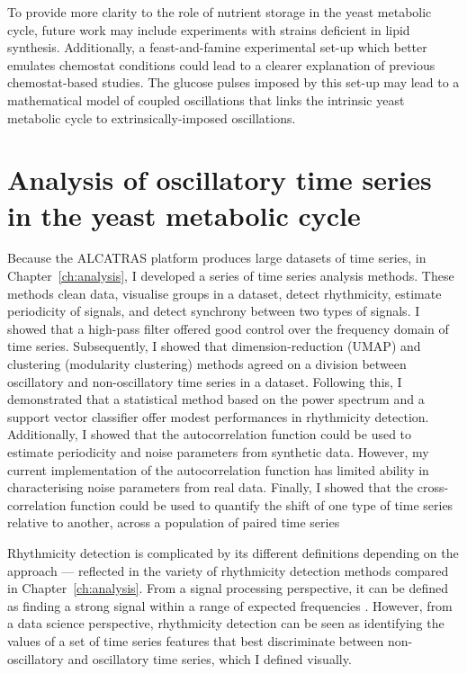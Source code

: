 To provide more clarity to the role of nutrient storage in the yeast metabolic cycle, future work may include experiments with strains deficient in lipid synthesis.
Additionally, a feast-and-famine experimental set-up which better emulates chemostat conditions could lead to a clearer explanation of previous chemostat-based studies.
The glucose pulses imposed by this set-up may lead to a mathematical model of coupled oscillations that links the intrinsic yeast metabolic cycle to extrinsically-imposed oscillations.


\section{Analysis of oscillatory time series in the yeast metabolic cycle}
\label{sec:concl-analysis}

Because the ALCATRAS platform produces large datasets of time series, in Chapter~\ref{ch:analysis}, I developed a series of time series analysis methods.
These methods clean data, visualise groups in a dataset, detect rhythmicity, estimate periodicity of signals, and detect synchrony between two types of signals.
I showed that a high-pass filter offered good control over the frequency domain of time series.
Subsequently, I showed that dimension-reduction (UMAP) and clustering (modularity clustering) methods agreed on a division between oscillatory and non-oscillatory time series in a dataset.
Following this, I demonstrated that a statistical method based on the power spectrum and a support vector classifier offer modest performances in rhythmicity detection.
Additionally, I showed that the autocorrelation function could be used to estimate periodicity and noise parameters from synthetic data.
However, my current implementation of the autocorrelation function has limited ability in characterising noise parameters from real data.
Finally, I showed that the cross-correlation function could be used to quantify the shift of one type of time series relative to another, across a population of paired time series

Rhythmicity detection is complicated by its different definitions depending on the approach --- reflected in the variety of rhythmicity detection methods compared in Chapter~\ref{ch:analysis}.
From a signal processing perspective, it can be defined as finding a strong signal within a range of expected frequencies \parencite{zielinskiStrengthsLimitationsPeriod2014}.
However, from a data science perspective, rhythmicity detection can be seen as identifying the values of a set of time series features that best discriminate between non-oscillatory and oscillatory time series, which I defined visually.

